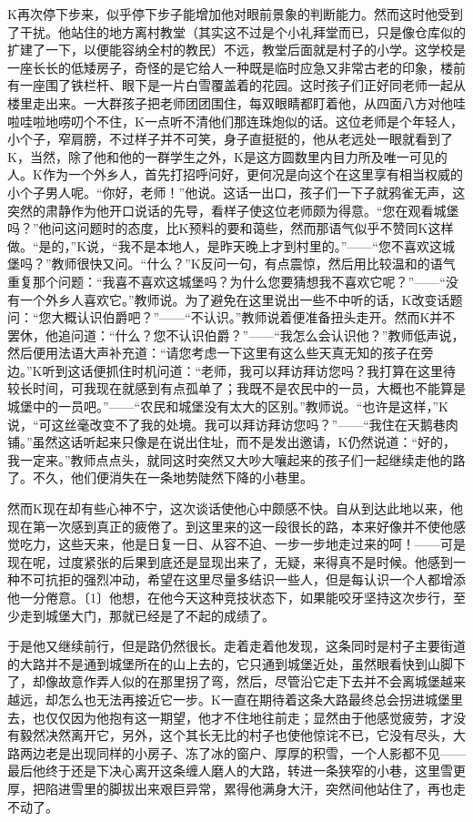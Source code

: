\documentclass[12pt,a4paper]{article}
\begin{document}
K再次停下步来，似乎停下步子能增加他对眼前景象的判断能力。然而这时他受到了干扰。他站住的地方离村教堂（其实这不过是个小礼拜堂而已，只是像仓库似的扩建了一下，以便能容纳全村的教民）不远，教堂后面就是村子的小学。这学校是一座长长的低矮房子，奇怪的是它给人一种既是临时应急又非常古老的印象，楼前有一座围了铁栏杆、眼下是一片白雪覆盖着的花园。这时孩子们正好同老师一起从楼里走出来。一大群孩子把老师团团围住，每双眼睛都盯着他，从四面八方对他哇啦哇啦地唠叨个不住，K一点听不清他们那连珠炮似的话。这位老师是个年轻人，小个子，窄肩膀，不过样子并不可笑，身子直挺挺的，他从老远处一眼就看到了K，当然，除了他和他的一群学生之外，K是这方圆数里内目力所及唯一可见的人。K作为一个外乡人，首先打招呼问好，更何况是向这个在这里享有相当权威的小个子男人呢。“你好，老师！”他说。这话一出口，孩子们一下子就鸦雀无声，这突然的肃静作为他开口说话的先导，看样子使这位老师颇为得意。“您在观看城堡吗？”他问这问题时的态度，比K预料的要和蔼些，然而那语气似乎不赞同K这样做。“是的，”K说，“我不是本地人，是昨天晚上才到村里的。”——“您不喜欢这城堡吗？”教师很快又问。“什么？”K反问一句，有点震惊，然后用比较温和的语气重复那个问题：“我喜不喜欢这城堡吗？为什么您要猜想我不喜欢它呢？”——“没有一个外乡人喜欢它。”教师说。为了避免在这里说出一些不中听的话，K改变话题问：“您大概认识伯爵吧？”——“不认识。”教师说着便准备扭头走开。然而K并不罢休，他追问道：“什么？您不认识伯爵？”——“我怎么会认识他？”教师低声说，然后便用法语大声补充道：“请您考虑一下这里有这么些天真无知的孩子在旁边。”K听到这话便抓住时机问道：“老师，我可以拜访拜访您吗？我打算在这里待较长时间，可我现在就感到有点孤单了；我既不是农民中的一员，大概也不能算是城堡中的一员吧。”——“农民和城堡没有太大的区别。”教师说。“也许是这样，”K说，“可这丝毫改变不了我的处境。我可以拜访拜访您吗？”——“我住在天鹅巷肉铺。”虽然这话听起来只像是在说出住址，而不是发出邀请，K仍然说道：“好的，我一定来。”教师点点头，就同这时突然又大吵大嚷起来的孩子们一起继续走他的路了。不久，他们便消失在一条地势陡然下降的小巷里。

然而K现在却有些心神不宁，这次谈话使他心中颇感不快。自从到达此地以来，他现在第一次感到真正的疲倦了。到这里来的这一段很长的路，本来好像并不使他感觉吃力，这些天来，他是日复一日、从容不迫、一步一步地走过来的呵！——可是现在呢，过度紧张的后果到底还是显现出来了，无疑，来得真不是时候。他感到一种不可抗拒的强烈冲动，希望在这里尽量多结识一些人，但是每认识一个人都增添他一分倦意。〔1〕他想，在他今天这种竞技状态下，如果能咬牙坚持这次步行，至少走到城堡大门，那就已经是了不起的成绩了。

于是他又继续前行，但是路仍然很长。走着走着他发现，这条同时是村子主要街道的大路并不是通到城堡所在的山上去的，它只通到城堡近处，虽然眼看快到山脚下了，却像故意作弄人似的在那里拐了弯，然后，尽管沿它走下去并不会离城堡越来越远，却怎么也无法再接近它一步。K一直在期待着这条大路最终总会拐进城堡里去，也仅仅因为他抱有这一期望，他才不住地往前走；显然由于他感觉疲劳，才没有毅然决然离开它，另外，这个其长无比的村子也使他惊诧不已，它没有尽头，大路两边老是出现同样的小房子、冻了冰的窗户、厚厚的积雪，一个人影都不见——最后他终于还是下决心离开这条缠人磨人的大路，转进一条狭窄的小巷，这里雪更厚，把陷进雪里的脚拔出来艰巨异常，累得他满身大汗，突然间他站住了，再也走不动了。
\end{document}
